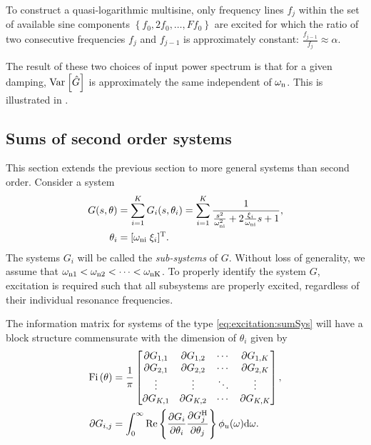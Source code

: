 To construct a quasi-logarithmic multisine, only frequency lines $f_j$ within the set of available sine components $\left\{f_0, 2 f_0, \ldots, F f_0  \right\}$ are excited for which the ratio of two consecutive frequencies $f_j$ and $f_{j-1}$ is approximately constant: $\frac{f_{j-1}}{f_j} \approx \alpha$.

The result of these two choices of input power spectrum is that for a given damping, $\var{\hat{G}}$ is approximately the same independent of $\wn$. 
This is illustrated in .

\subsection{Sums of second order systems}
This section extends the previous section to more general systems than second order.
Consider a system
\begin{align}
G(s,\theta) &= \sum_{i=1}^{K} G_i(s,\theta_i)
             =\sum_{i=1}^{K}  \frac{1}
                                   {   \frac{s^2}{\wn[i]^2}
                                    + 2\frac{\damping_i}{\wn[i]}s
                                    + 1},\\
\theta_i&=[\wn[i]\;\damping_i]^{\T}.
\label{eq:excitation:sumSys}
\end{align}
The systems  $G_i$ will be called the \emph{sub-systems} of $G$. 
Without loss of generality, we assume that $\wn[1] < \wn[2] < \cdots < \wn[K]$. 
To properly identify the system $G$, excitation is required such that all subsystems are properly excited, regardless of their individual resonance frequencies.

The information matrix for systems of the type \eqref{eq:excitation:sumSys} will have a block structure commensurate with the dimension of $\theta_i$ given by
\begin{align}
\IF &= \frac{1}{\pi}
\begin{bmatrix}
  \partial G_{1,1}        &\partial G_{1,2}       &\cdots         &\partial G_{1,K}\\
  \partial G_{2,1}        &\partial G_{2,2}       &\cdots         &\partial G_{2,K}\\
  \vdots                  &\vdots                 &\ddots         &\vdots          \\
  \partial G_{K,1}        &\partial G_{K,2}       &\cdots         &\partial G_{K,K}
\end{bmatrix},\\
\partial G_{i,j} &= \int_0^\infty
                      \mathrm{Re}\left\{
                          \frac{\partial G_i}
                               {\partial \theta_i}
                          \frac{\partial G_j^{\HT}}
                               {\partial \theta_j}
                                \right\}
                      \phi_u(\omega)\dd\omega.
\end{align}

